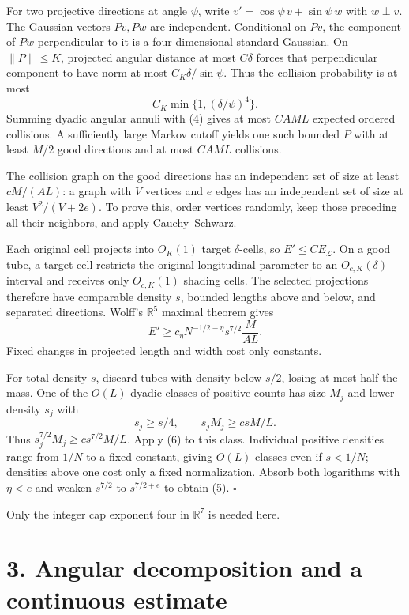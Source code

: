 \documentclass[
  11pt,
  a4paper,
]{article}
\begin{document}
For two projective directions at angle \(\psi\), write
\(v'=\cos\psi\,v+\sin\psi\,w\) with \(w\perp v\). The Gaussian vectors
\(Pv,Pw\) are independent. Conditional on \(Pv\), the component of
\(Pw\) perpendicular to it is a four-dimensional standard Gaussian. On
\(\|P\|\le K\), projected angular distance at most \(C\delta\) forces
that perpendicular component to have norm at most
\(C_K\delta/\sin\psi\). Thus the collision probability is at most \[
 C_K\min\{1,(\delta/\psi)^4\}.
\] Summing dyadic angular annuli with (4) gives at most \(CAM L\)
expected ordered collisions. A sufficiently large Markov cutoff yields
one such bounded \(P\) with at least \(M/2\) good directions and at most
\(CAM L\) collisions.

The collision graph on the good directions has an independent set of
size at least \(cM/(AL)\): a graph with \(V\) vertices and \(e\) edges
has an independent set of size at least \(V^2/(V+2e)\). To prove this,
order vertices randomly, keep those preceding all their neighbors, and
apply Cauchy--Schwarz.

Each original cell projects into \(O_K(1)\) target \(\delta\)-cells, so
\(E'\le CE_{\mathcal L}\). On a good tube, a target cell restricts the
original longitudinal parameter to an \(O_{c,K}(\delta)\) interval and
receives only \(O_{c,K}(1)\) shading cells. The selected projections
therefore have comparable density \(s\), bounded lengths above and
below, and separated directions. Wolff's \(\mathbb R^5\) maximal theorem
gives \[
 E'\ge c_\eta N^{-1/2-\eta}s^{7/2}\frac{M}{AL}.
\tag{6}\label{eq:6}
\] Fixed changes in projected length and width cost only constants.

For total density \(s\), discard tubes with density below \(s/2\),
losing at most half the mass. One of the \(O(L)\) dyadic classes of
positive counts has size \(M_j\) and lower density \(s_j\) with \[
 s_j\ge s/4,\qquad s_jM_j\ge csM/L.
\] Thus \(s_j^{7/2}M_j\ge cs^{7/2}M/L\). Apply (6) to this class.
Individual positive densities range from \(1/N\) to a fixed constant,
giving \(O(L)\) classes even if \(s<1/N\); densities above one cost only
a fixed normalization. Absorb both logarithms with \(\eta<e\) and weaken
\(s^{7/2}\) to \(s^{7/2+e}\) to obtain (5). \(\square\)

Only the integer cap exponent four in \(\mathbb R^7\) is needed here.

\hypertarget{angular-decomposition-and-a-continuous-estimate}{%
\section{3. Angular decomposition and a continuous
estimate}\label{angular-decomposition-and-a-continuous-estimate}}
\end{document}
